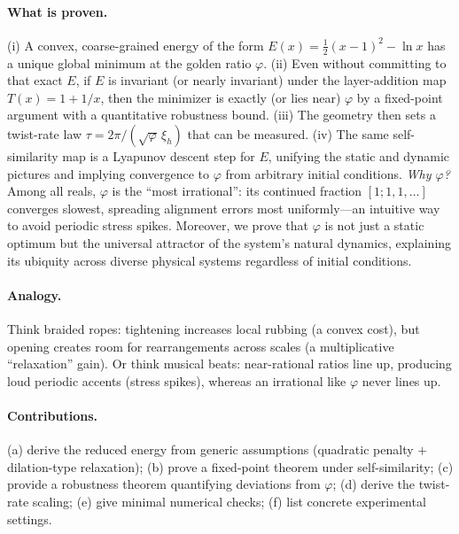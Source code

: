 \documentclass[11pt]{article}
\theoremstyle{remark}
\theoremstyle{definition}
\newcommand{\ph}{\varphi}
\begin{document}
\paragraph{What is proven.} (i) A convex, coarse-grained energy of the form $E(x)=\tfrac12(x-1)^2-\ln x$ has a unique global minimum at the golden ratio $\ph$. (ii) Even without committing to that exact $E$, if $E$ is invariant (or nearly invariant) under the layer-addition map $T(x)=1+1/x$, then the minimizer is exactly (or lies near) $\ph$ by a fixed-point argument with a quantitative robustness bound. (iii) The geometry then sets a twist-rate law $\tau=2\pi/(\sqrt{\ph}\,\xi_h)$ that can be measured. (iv) The same self-similarity map is a Lyapunov descent step for $E$, unifying the static and dynamic pictures and implying convergence to $\varphi$ from arbitrary initial conditions. \emph{Why $\ph$?} Among all reals, $\ph$ is the ``most irrational'': its continued fraction $[1;1,1,\ldots]$ converges slowest, spreading alignment errors most uniformly---an intuitive way to avoid periodic stress spikes. Moreover, we prove that $\varphi$ is not just a static optimum but the universal attractor of the system's natural dynamics, explaining its ubiquity across diverse physical systems regardless of initial conditions.\paragraph{Analogy.} Think braided ropes: tightening increases local rubbing (a convex cost), but opening creates room for rearrangements across scales (a multiplicative ``relaxation'' gain). Or think musical beats: near-rational ratios line up, producing loud periodic accents (stress spikes), whereas an irrational like $\ph$ never lines up.

\paragraph{Contributions.} (a) derive the reduced energy from generic assumptions (quadratic penalty $+$ dilation-type relaxation); (b) prove a fixed-point theorem under self-similarity; (c) provide a robustness theorem quantifying deviations from $\ph$; (d) derive the twist-rate scaling; (e) give minimal numerical checks; (f) list concrete experimental settings.
\end{document}
